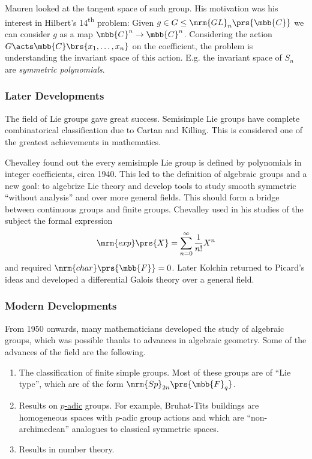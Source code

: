 \documentclass[10pt,a4paper,twoside,openany,hidelinks]{book}
\begin{document}
Mauren looked at the tangent space of such group. His motivation was his interest in Hilbert's 14\textsuperscript{th} problem:
Given $g \in G \leq \mrm{GL}_n\prs{\mbb{C}}$ we can consider $g$ as a map $\mbb{C}^n \to \mbb{C}^n$. Considering the action $G \acts \mbb{C}\brs{x_1, \ldots, x_n}$ on the coefficient, the problem is understanding the invariant space of this action.
E.g. the invariant space of $S_n$ are \emph{symmetric polynomials}.

\subsubsection{Later Developments}

The field of Lie groups gave great success. Semisimple Lie groups have complete combinatorical classification due to Cartan and Killing. This is considered one of the greatest achievements in mathematics.

Chevalley found out the every semisimple Lie group is defined by polynomials in integer coefficients, circa 1940. This led to the definition of algebraic groups and a new goal: to algebrize Lie theory and develop tools to study smooth symmetric ``without analysis'' and over more general fields. This should form a bridge between continuous groups and finite groups.
Chevalley used in his studies of the subject the formal expression
\[\mrm{exp}\prs{X} = \sum_{n=0}^\infty \frac{1}{n!} X^n\]
and required $\mrm{char}\prs{\mbb{F}} = 0$.
Later Kolchin returned to Picard's ideas and developed a differential Galois theory over a general field.

\subsubsection{Modern Developments}

From 1950 onwards, many mathematicians developed the study of algebraic groups, which was possible thanks to advances in algebraic geometry.
Some of the advances of the field are the following.

\begin{enumerate}
\item The classification of finite simple groups. Most of these groups are of ``Lie type'', which are of the form $\mrm{Sp}_{2n}\prs{\mbb{F}_q}$.

\item Results on \href{https://ncatlab.org/nlab/show/p-adic+completion}{$p$-adic} groups. For example, Bruhat-Tits buildings are homogeneous spaces with $p$-adic group actions and which are ``non-archimedean'' analogues to classical symmetric spaces.

\item Results in number theory.
\end{enumerate}
\end{document}
